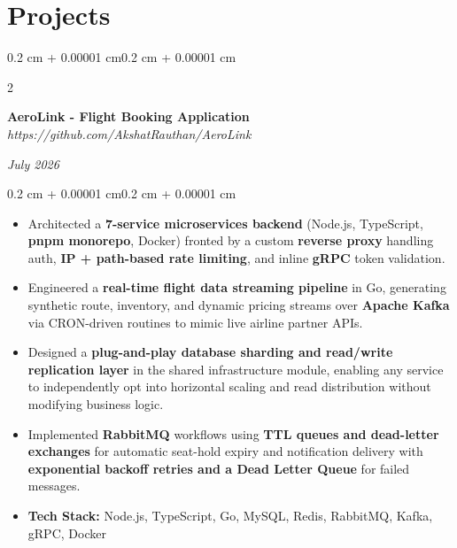 \documentclass[10pt, letterpaper]{article}
\newenvironment{highlights}{
    \begin{itemize}[
        topsep=0.06 cm,
        parsep=0.06 cm,
        partopsep=0pt,
        itemsep=0pt,
        leftmargin=0.4 cm + 10pt
    ]
}{
    \end{itemize}
}
\newenvironment{onecolentry}{
    \begin{adjustwidth}{0.2 cm + 0.00001 cm}{0.2 cm + 0.00001 cm}
}{
    \end{adjustwidth}
}
\newenvironment{twocolentry}[2][]{
    \onecolentry
    \def\secondColumn{#2}
    \setcolumnwidth{\fill, 4.5 cm}
    \begin{paracol}{2}
}{
    \switchcolumn \raggedleft \secondColumn
    \end{paracol}
    \endonecolentry
}
\let\hrefWithoutArrow\href
\renewcommand{\href}[2]{\hrefWithoutArrow{#1}{\ifthenelse{\equal{#2}{}}{ }{#2 }\raisebox{.15ex}{\footnotesize \faExternalLink*}}}
\begin{document}
\section{Projects}


    \begin{twocolentry}{\textit{July 2026}}
        \textbf{AeroLink - Flight Booking Application} \quad
        \textit{https://github.com/AkshatRauthan/AeroLink}
    \end{twocolentry}
    \vspace{0.10 cm}
    \begin{onecolentry}
        \begin{highlights}
            \item Architected a \textbf{7-service microservices backend} (Node.js, TypeScript, \textbf{pnpm monorepo}, Docker) fronted by a custom \textbf{reverse 
                proxy} handling auth, \textbf{IP + path-based rate limiting}, and inline \textbf{gRPC} token validation.
            \item Engineered a \textbf{real-time flight data streaming pipeline} in Go, generating synthetic route, inventory, and dynamic pricing streams over 
                \textbf{Apache Kafka} via CRON-driven routines to mimic live airline partner APIs.
            \item Designed a \textbf{plug-and-play database sharding and read/write replication layer} in the shared infrastructure module, enabling any service 
                to independently opt into horizontal scaling and read distribution without modifying business logic.
            \item Implemented \textbf{RabbitMQ} workflows using \textbf{TTL queues and dead-letter exchanges} for automatic seat-hold expiry and notification 
                delivery with \textbf{exponential backoff retries and a Dead Letter Queue} for failed messages.
            \item \textbf{Tech Stack:} Node.js, TypeScript, Go, MySQL, Redis, RabbitMQ, Kafka, gRPC, Docker
        \end{highlights}
    \end{onecolentry}
    \vspace{0.3 cm}
\end{document}
